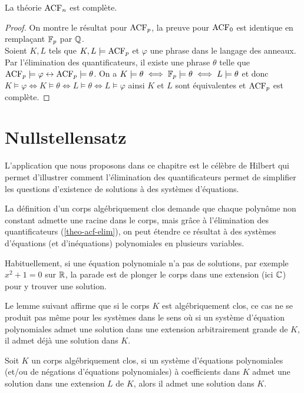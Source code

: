 \begin{prop}[Complétude]
    La théorie $\operatorname{ACF}_n$ est complète.
\end{prop}

\begin{proof}
On montre le résultat pour $\operatorname{ACF}_p$, la preuve pour $\operatorname{ACF}_0$ est identique en
remplaçant $\mathbb{F}_p$ par $\mathbb{Q}$. \\
Soient $K,L$ tels que $K,L \models \operatorname{ACF}_p$ et $\varphi$ une phrase dans le
langage des anneaux. Par l'élimination des quantificateurs, il existe une phrase
$\theta$ telle que $\operatorname{ACF}_p \models \varphi \leftrightarrow \operatorname{ACF}_p \models
\theta$. On a $K \models \theta \iff
\mathbb{F}_p \models \theta \iff L \models \theta$ et donc $K \models \varphi
\iff K \models \theta \iff L \models \theta
\iff L \models \varphi$ ainsi $K$ et $L$ sont équivalentes et
$\operatorname{ACF}_p$ est complète.
\end{proof}

\section{Nullstellensatz}

L'application que nous proposons dans ce chapitre est le célèbre
 de Hilbert qui permet d'illustrer comment
l'élimination des quantificateurs permet de simplifier les questions d'existence
de solutions à des systèmes d'équations.

La définition d'un corps algébriquement clos demande que chaque polynôme non
constant admette une racine dans le corps, mais grâce à l'élimination des
quantificateurs (\cref{theo-acf-elim}), on peut étendre ce résultat à des
systèmes d'équations (et d'inéquations) polynomiales en plusieurs variables.

Habituellement, si une équation polynomiale n'a pas de solutions, par exemple
$x^2 + 1 = 0$ sur $\mathbb{R}$, la parade est de plonger le corps dans une extension
(ici $\mathbb{C}$) pour y trouver une solution.

Le lemme suivant affirme que si le corps $K$ est algébriquement clos, ce
cas ne se produit pas même pour les systèmes dans le sens où si un système
d'équation polynomiales admet une solution dans une extension arbitrairement
grande de $K$, il admet déjà une solution dans $K$.


\begin{lemm}\label{lemm-solution-systeme}
Soit $K$ un corps algébriquement clos, si un système  d'équations
polynomiales (et/ou de négations d'équations polynomiales) à
coefficients dans $K$ admet une solution dans une extension $L$ de $K$, alors il
admet une solution dans $K$.
\end{lemm}

